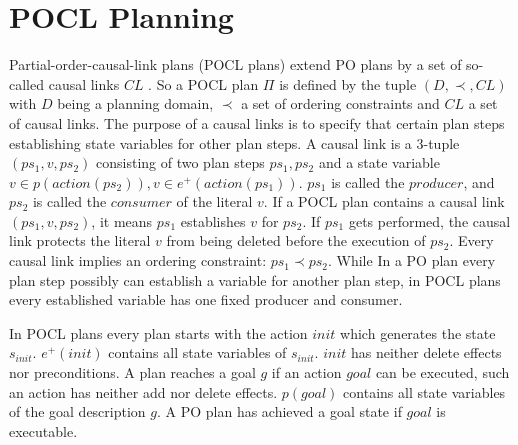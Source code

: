 \newpage
\section{POCL Planning}
Partial-order-causal-link plans (POCL plans) extend PO plans by a set of so-called causal links $CL$ \cite{McAllester}. 
So a POCL plan $\Pi$ is defined by the tuple $(D,\prec,CL)$ 
with $D$ being a planning domain, $\prec$ a set of ordering constraints and $CL$ a set of causal links.
The purpose of a causal links is to specify that certain plan steps establishing state variables for other plan steps. 
A causal link is a 3-tuple $(ps_1,v,ps_2)$ consisting of two plan steps $ps_1,ps_2$ and a 
state variable $v \in p(action(ps_2)),v \in e^+(action(ps_1))$. $ps_1$ is called the 
$producer$, and $ps_2$ is called the $consumer$ of the literal $v$.
If a POCL plan contains a causal link $(ps_1,v,ps_2)$, it means $ps_1$ establishes $v$ for $ps_2$. If $ps_1$ gets performed, 
the causal link protects the literal $v$ from being deleted before the execution of $ps_2$. 
Every causal link implies an ordering constraint: $ps_1 \prec ps_2$. While In a PO plan every plan step possibly can 
establish a variable for another plan step, in POCL plans every established variable has one fixed producer and consumer.

In POCL plans every plan starts with the action $init$ which generates the 
state $s_{init}$. $e^+(init)$ contains all state variables of $s_{init}$. $init$ has neither delete effects nor preconditions. 
A plan reaches a goal $g$ if an action $goal$ can be executed, such an action has neither add nor delete effects. $p(goal)$ contains 
all state variables of the goal description $g$. A PO plan has achieved a goal state if $goal$ is executable. 

